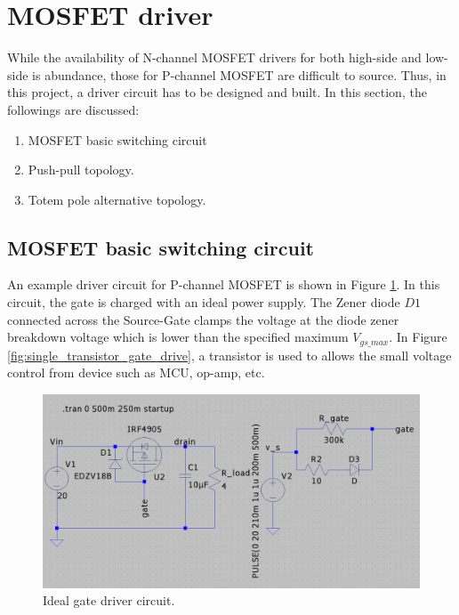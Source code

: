 \documentclass[main.tex]{subfiles}
\begin{document}
    \section{MOSFET driver}
    \justify
    While the availability of N-channel MOSFET drivers for both high-side and low-side is abundance, those for P-channel MOSFET are difficult to source. Thus, in this project, a driver circuit has to be designed and built. In this section, the followings are discussed:
    \begin{enumerate}
        \item MOSFET basic switching circuit
        \item Push-pull topology.
        \item Totem pole alternative topology.
    \end{enumerate}   

    \pagebreak
    \subsection{MOSFET basic switching circuit} 
    
    An example driver circuit for P-channel MOSFET is shown in Figure \ref{fig:ideal_gate_drive}. In this circuit, the gate is charged with an ideal power supply. The Zener diode $D1$ connected across the Source-Gate clamps the voltage at the diode zener breakdown voltage which is lower than the specified maximum $V_{gs\_max}$. In Figure \ref{fig:single_transistor_gate_drive}, a transistor is used to allows the small voltage control from device such as MCU, op-amp, etc.

    \begin{figure}[!h]
        \centerline{\includegraphics[width=\linewidth]{media/ideal_gate_drive.png}}
        \caption{Ideal gate driver circuit.}
        \label{fig:ideal_gate_drive}
    \end{figure}
\end{document}
